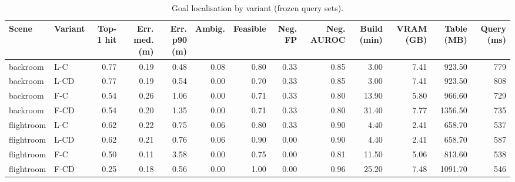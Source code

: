 \begin{table}[ht]
\centering\small
\begin{tabular}{@{}llrrrrrrrrrrr@{}}
\toprule
Scene & Variant & Top-1 hit & Err. med. (m) & Err. p90 (m) & Ambig. & Feasible & Neg. FP & Neg. AUROC & Build (min) & VRAM (GB) & Table (MB) & Query (ms) \\
\midrule
backroom & L-C & 0.77 & 0.19 & 0.48 & 0.08 & 0.80 & 0.33 & 0.85 & 3.00 & 7.41 & 923.50 & 779 \\
backroom & L-CD & 0.77 & 0.19 & 0.54 & 0.00 & 0.70 & 0.33 & 0.85 & 3.00 & 7.41 & 923.50 & 808 \\
backroom & F-C & 0.54 & 0.26 & 1.06 & 0.00 & 0.71 & 0.33 & 0.80 & 13.90 & 5.80 & 966.60 & 729 \\
backroom & F-CD & 0.54 & 0.20 & 1.35 & 0.00 & 0.71 & 0.33 & 0.80 & 31.40 & 7.77 & 1356.50 & 735 \\
\midrule
flightroom & L-C & 0.62 & 0.22 & 0.75 & 0.06 & 0.80 & 0.33 & 0.90 & 4.40 & 2.41 & 658.70 & 537 \\
flightroom & L-CD & 0.62 & 0.21 & 0.76 & 0.06 & 0.90 & 0.00 & 0.90 & 4.40 & 2.41 & 658.70 & 587 \\
flightroom & F-C & 0.50 & 0.11 & 3.58 & 0.00 & 0.75 & 0.00 & 0.81 & 11.50 & 5.06 & 813.60 & 538 \\
flightroom & F-CD & 0.25 & 0.18 & 0.56 & 0.00 & 1.00 & 0.00 & 0.96 & 25.20 & 7.48 & 1091.70 & 546 \\
\bottomrule
\end{tabular}
\caption{Goal localisation by variant (frozen query sets).}
\label{tab:sem-variants}
\end{table}
